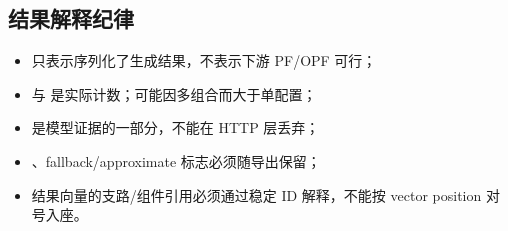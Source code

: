 \subsection{结果解释纪律}
\begin{itemize}
  \item {} 只表示序列化了生成结果，不表示下游 PF/OPF 可行；
  \item {} 与  是实际计数；可能因多组合而大于单配置；
  \item {} 是模型证据的一部分，不能在 HTTP 层丢弃；
  \item {}、fallback/approximate 标志必须随导出保留；
  \item 结果向量的支路/组件引用必须通过稳定 ID 解释，不能按 vector position 对号入座。
\end{itemize}
